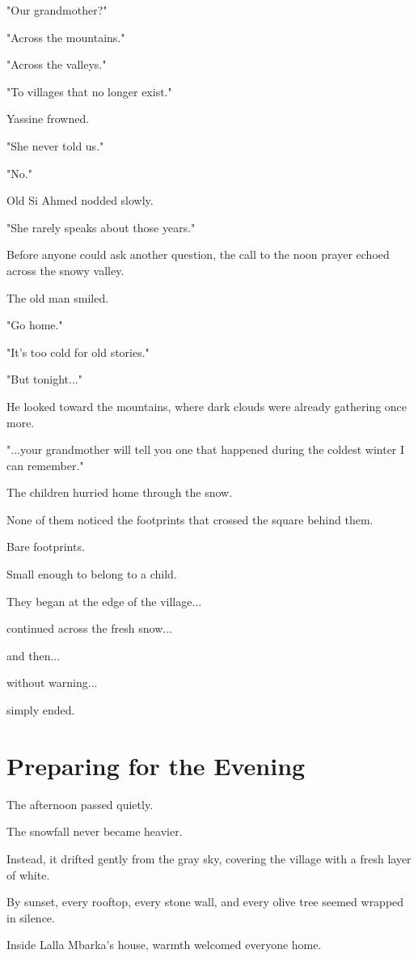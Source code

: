 \documentclass[12pt,openany]{book}
\begin{document}
"Our grandmother?"

"Across the mountains."

"Across the valleys."

"To villages that no longer exist."

Yassine frowned.

"She never told us."

"No."

Old Si Ahmed nodded slowly.

"She rarely speaks about those years."

Before anyone could ask another question, the call to the noon prayer echoed across the snowy valley.

The old man smiled.

"Go home."

"It's too cold for old stories."

"But tonight..."

He looked toward the mountains, where dark clouds were already gathering once more.

"...your grandmother will tell you one that happened during the coldest winter I can remember."

The children hurried home through the snow.

None of them noticed the footprints that crossed the square behind them.

Bare footprints.

Small enough to belong to a child.

They began at the edge of the village...

continued across the fresh snow...

and then...

without warning...

simply ended.
\section*{Preparing for the Evening}

The afternoon passed quietly.

The snowfall never became heavier.

Instead, it drifted gently from the gray sky, covering the village with a fresh layer of white.

By sunset, every rooftop, every stone wall, and every olive tree seemed wrapped in silence.

Inside Lalla Mbarka's house, warmth welcomed everyone home.
\end{document}
